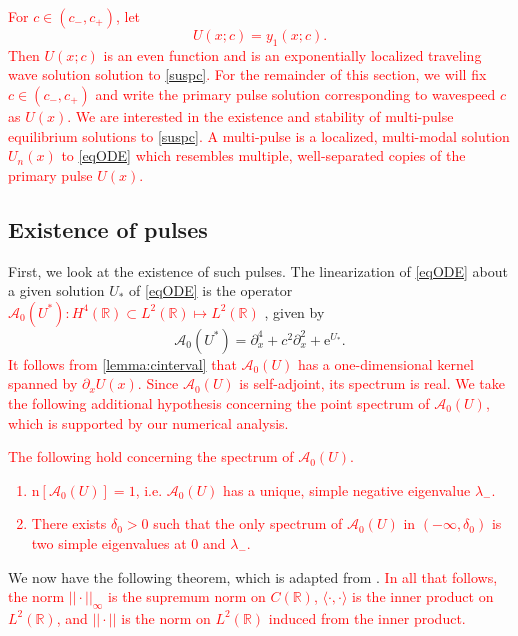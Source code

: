 \documentclass[review,onefignum,onetabnum]{siamart171218}
\newcommand{\R}{\mathbb{R}}
\newcommand{\rme}{\mathrm{e}}
\newcommand{\rmn}{\mathrm{n}}
\newcommand{\calA}{\mathcal{A}}
\newcommand{\revised}[1]{ \textcolor{red}{#1} }
\begin{document}
\revised{
For $c \in (c_-, c_+)$, let
\begin{equation}\label{suspU}
U(x; c) = y_1(x; c).
\end{equation}
Then $U(x; c)$ is an even function and is an exponentially localized traveling wave solution solution to \cref{suspc}. For the remainder of this section, we will fix $c \in (c_-, c_+)$ and write the primary pulse solution corresponding to wavespeed $c$ as $U(x)$. We are interested in the existence and stability of multi-pulse equilibrium solutions to \cref{suspc}. A multi-pulse is a localized, multi-modal solution $U_n(x)$ to \cref{eqODE} which resembles multiple, well-separated copies of the primary pulse $U(x)$.
}

\subsection{Existence of pulses}

First, we look at the existence of such pulses. The linearization of \cref{eqODE} about a given solution $U_*$ of \cref{eqODE} is the operator 
\revised{
$\calA_0(U^*): H^4(\R) \subset L^2(\R) \mapsto L^2(\R)$}
, given by
\begin{equation}\label{defA0}
\calA_0(U^*) = \partial_x^4 + c^2 \partial_x^2 + \rme^{U_*}.
\end{equation}
\revised{
It follows from \cref{lemma:cinterval} that $\calA_0(U)$ has a one-dimensional kernel spanned by $\partial_x U(x)$. Since $\calA_0(U)$ is self-adjoint, its spectrum is real. We take the following additional hypothesis concerning the point spectrum of $\calA_0(U)$, which is supported by our numerical analysis.
}

\revised{
\begin{hypothesis}\label{A0hyp}
The following hold concerning the spectrum of $\calA_0(U)$.
\begin{enumerate}
\item $\rmn[\calA_0(U)]=1$, i.e. $\calA_0(U)$ has a unique, simple negative eigenvalue $\lambda_-$.
\item There exists $\delta_0 > 0$ such that the only spectrum of $\calA_0(U)$ in $(-\infty, \delta_0)$ is two simple eigenvalues at $0$ and $\lambda_-$.
\end{enumerate}
\end{hypothesis}
}

We now have the following theorem, which is adapted from \cite[Theorem~3.6]{sandstede:iol97}.
\revised{
In all that follows, the norm $||\cdot||_\infty$ is the supremum norm on $C(\R)$, $\langle \cdot, \cdot \rangle$ is the inner product on $L^2(\R)$, and $|| \cdot ||$ is the norm on $L^2(\R)$ induced from the inner product.
}
\end{document}
